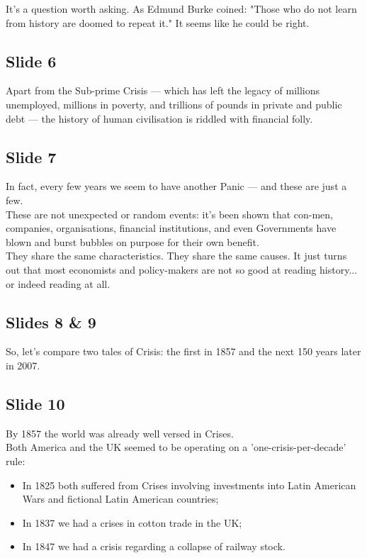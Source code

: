 \documentclass[a4paper, 11pt]{article} %
\begin{document}
It's a question worth asking. As Edmund Burke coined: "Those who do not learn from history are doomed to repeat it." It seems like he could be right.


\subsection*{Slide 6}

Apart from the Sub-prime Crisis --- which has left the legacy of millions unemployed, millions in poverty, and trillions of pounds in private and public debt --- the history of human civilisation is riddled with financial folly.


\subsection*{Slide 7}

In fact, every few years we seem to have another Panic --- and these are just a few.\\

These are not unexpected or random events: it's been shown that con-men, companies, organisations, financial institutions, and even Governments have blown and burst bubbles on purpose for their own benefit.\\

They share the same characteristics. They share the same causes. It just turns out that most economists and policy-makers are not so good at reading history... or indeed reading at all.


\subsection*{Slides 8 \& 9}

So, let's compare two tales of Crisis: the first in 1857 and the next 150 years later in 2007.



\subsection*{Slide 10}

By 1857 the world was already well versed in Crises.\\

Both America and the UK seemed to be operating on a 'one-crisis-per-decade' rule:
\begin{itemize}
\item In 1825 both suffered from Crises involving investments into Latin American Wars and fictional Latin American countries;
\item In 1837 we had a crises in cotton trade in the UK; 
\item In 1847 we had a crisis regarding a collapse of railway stock.
\end{itemize}
\end{document}
